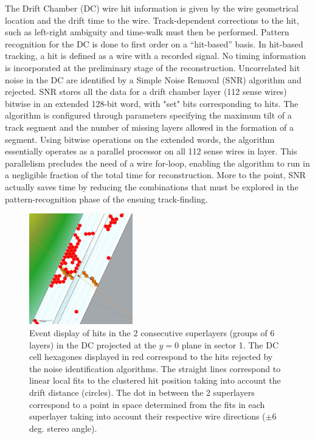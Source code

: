 \documentclass[3p,times,twocolumn]{elsarticle}
\begin{document}
The Drift Chamber (DC) wire hit information is given by the wire geometrical location and the drift time
to the wire. Track-dependent corrections to the hit, such as left-right ambiguity and time-walk must then
be performed. Pattern recognition for the DC is done to first order on a ``hit-based'' basis. In hit-based
tracking, a hit is defined as a wire with a recorded signal.  No timing information is incorporated at the
preliminary stage of the reconstruction.  Uncorrelated hit noise in the DC are identified by a Simple Noise
Removal (SNR) algorithm and rejected. SNR stores all the data for a drift chamber layer (112 sense wires)
bitwise in an extended 128-bit word, with "set" bits corresponding to hits. The algorithm is configured
through parameters specifying the maximum tilt of a track segment and the number of missing layers
allowed in the formation of a segment. Using bitwise operations on the extended words, the algorithm
essentially operates as a parallel processor on all 112 sense wires in layer. This parallelism precludes the
need of a wire for-loop, enabling the algorithm to run in a negligible fraction of the total time for
reconstruction. More to the point, SNR actually saves time by reducing the combinations that must be
explored in the pattern-recognition phase of the ensuing track-finding.


\begin{figure}
\centering
\includegraphics[width=0.4\textwidth]{pics/dcTracks2.png}
\caption{Event display of hits in the 2 consecutive superlayers (groups of 6 layers) in the DC projected at the $y=0$ plane in sector 1.
The DC cell hexagones displayed in red correspond to the hits rejected by the noise
identification algorithms.  The straight lines correspond to linear local fits to the clustered hit
position taking into account the drift distance (circles). The dot in between the
2 superlayers correspond to a point in space determined from the fits in each superlayer taking into
account their respective wire directions ($\pm 6$ deg. stereo angle).
}
\label{fig:dcsegs}
\end{figure}
\end{document}
